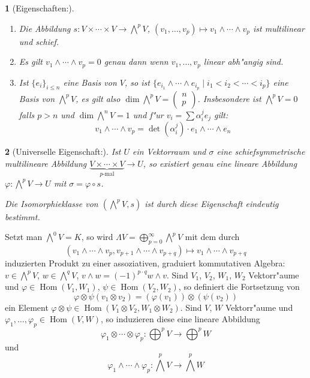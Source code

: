 \documentclass[paper=A4, twoside, chapterprefix=true, bibliography=totoc, headsepline]{scrbook}
\let\temp\phi{}
\let\phi\varphi{}
\let\varphi\temp{}
\let\temp\theta{}
\let\theta\vartheta{}
\let\vartheta\temp{}
\let\temp\epsilon{}
\let\epsilon\varepsilon{}
\let\varepsilon\temp{}
\let\temp\rho{}
\let\rho\varrho{}
\let\varrho\temp{}
\DeclareMathOperator{\Hom}{Hom}     %
\newcommand{\X}{\times}
\theoremstyle{plain}
\theoremstyle{nonumberplain}
\theoremstyle{empty}
\newtheorem{emptythm}{}%
\theoremstyle{break}
\begin{document}
\begin{emptythm}[Eigenschaften:]
  \begin{enumerate}[label=(\arabic*),leftmargin=*]
  \item Die Abbildung $s: V \X \cdots \X V \to \bigwedge^p V$, $(v_1, \ldots ,v_p) \mapsto v_1 \wedge \cdots \wedge v_p$ ist multilinear und schief.
  \item Es gilt $v_1 \wedge \cdots \wedge v_p = 0$ genau dann wenn $v_1, \ldots , v_p$ linear abh"angig sind.
  \item Ist $\{e_i\}_{i \le n}$ eine Basis von $V$, so ist $\{e_{i_1} \wedge \cdots \wedge e_{i_p} \mid i_1 < i_2 < \cdots < i_p\}$ eine Basis von $\bigwedge^pV$, es gilt also $\dim \bigwedge^pV = \left( \begin{smallmatrix} n \\ p \end{smallmatrix} \right)$.
    Insbesondere ist $\bigwedge^pV = 0$ falls $p > n$ und $\dim \bigwedge^nV = 1$ und f"ur $v_i = \sum \alpha_i^j e_j$ gilt:
    \[ v_1 \wedge \cdots \wedge v_p = \det (\alpha_i^j) \cdot e_1 \wedge \cdots \wedge e_n \]
  \end{enumerate}
\end{emptythm}

\begin{emptythm}[Universelle Eigenschaft:]
Ist $U$ ein Vektorraum und $\sigma$ eine schiefsymmetrische multilineare Abbildung $\underbrace{V \X \cdots \X V}_{p\text{-mal}} \to U$, so existiert genau eine lineare Abbildung $\phi: \bigwedge^pV \to U$ mit $\sigma = \phi \circ s$.
\begin{center}\end{center}
Die Isomorphieklasse von $(\bigwedge^pV, s)$ ist durch diese Eigenschaft eindeutig bestimmt.
\end{emptythm}

Setzt man $\bigwedge^0V = K$, so wird $\Lambda V = \bigoplus_{p=0}^{\infty}\bigwedge^pV$ mit dem durch
	\[ (v_1 \wedge \cdots \wedge v_p, v_{p+1} \wedge \cdots \wedge v_{p+q}) \mapsto v_1 \wedge \cdots \wedge v_{p+q} \]
induzierten Produkt zu einer assoziativen, graduiert kommutativen Algebra: $v \in \bigwedge^pV$, $w \in \bigwedge^qV$, $v \wedge w = (-1)^{p \cdot q} w \wedge v$. Sind $V_1$, $V_2$, $W_1$, $W_2$ Vektorr"aume und $\phi \in \Hom(V_1, W_1)$, $\psi \in \Hom(V_2, W_2)$, so definiert die Fortsetzung von 
	\[ \phi \otimes \psi (v_1 \otimes v_2) = (\phi(v_1)) \otimes (\psi(v_2)) \]
ein Element $\phi \otimes \psi \in \Hom(V_1 \otimes V_2, W_1 \otimes W_2)$. Sind $V$, $W$ Vektorr"aume und $\phi_1,\ldots ,\phi_p \in \Hom(V, W)$, so induzieren diese eine lineare Abbildung
	\[ \phi_1 \otimes \cdots \otimes \phi_p : \bigoplus^p V \to \bigoplus^p W \]
und
	\[ \phi_1 \wedge \cdots  \wedge \phi_p : \bigwedge^pV \to \bigwedge^pW \]
\end{document}
